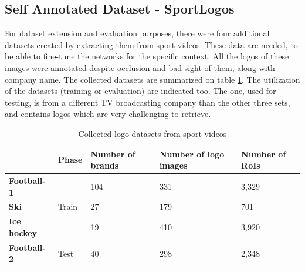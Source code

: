 \subsection{Self Annotated Dataset - SportLogos}\label{ss:sportlogos}
For dataset extension and evaluation purposes, there were four additional datasets created by extracting them from sport videos. These data are needed, to be able to fine-tune the networks for the specific context. All the logos of these images were annotated despite occlusion and bad sight of them, along with company name. The collected datasets are summarized on table \ref{table:ownlogodatasets}. The utilization of the datasets (training or evaluation) are indicated too. The one, used for testing, is from a different TV broadcasting company than the other three sets, and contains logos which are very challenging to retrieve.
\bigbreak
\begin{table}[ht!]
\centering
\begin{tabular}{|l|l|l|l|l|}
\hline & \textbf{Phase} & \textbf{Number of brands} & \textbf{Number of logo images} & \textbf{Number of RoIs} \\
\hline
\multicolumn{1}{|l|}{\textbf{Football-1}} & \multirow{3}{*}{Train} & \multicolumn{1}{l|}{104} & \multicolumn{1}{l|}{331} & \multicolumn{1}{l|}{3,329} \\\cline{1-1}\cline{3-5}
\multicolumn{1}{|l|}{\textbf{Ski}} & & \multicolumn{1}{l|}{27} & \multicolumn{1}{l|}{179} & \multicolumn{1}{l|}{701} \\\cline{1-1}\cline{3-5}
\multicolumn{1}{|l|}{\textbf{Ice hockey}} & & \multicolumn{1}{l|}{19} & \multicolumn{1}{l|}{410} & \multicolumn{1}{l|}{3,920} \\\hline
\textbf{Football-2} & Test & 40 & 298 & 2,348 \\ \hline
\end{tabular}
\caption{Collected logo datasets from sport videos}
\label{table:ownlogodatasets}
\end{table}
\bigbreak
